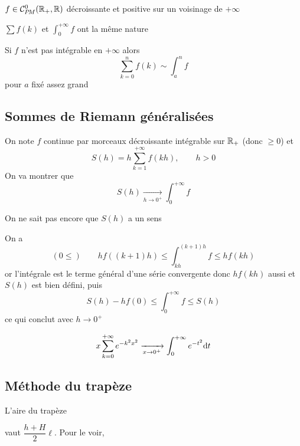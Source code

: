 \begin{prop}
    \Hyp $f\in \CPM(\R_+, \R)$ décroissante et positive sur un voisinage de $+\infty$
    \begin{concenum}
    \item $\sum f(k)$ et $\int_0^{+\infty} f$ ont la même nature
    \item Si $f$ n'est pas intégrable en $+\infty$ alors \[
            \sum_{k=0}^nf(k)\sim\int_a^nf
        \]
        pour $a$ fixé assez grand
    \end{concenum}
\end{prop}

\subsection{Sommes de Riemann généralisées}

On note $f$ continue par morceaux décroissante intégrable sur $\mathbb R_+$ (donc $\geq 0$) et \[
    S(h)=h\sum_{k=1}^{+\infty}f(kh), \qquad h>0
\]
On va montrer que \[
    S(h)\xrightarrow[h\to0^+]{} \int_0^{+\infty} f
\]

\begin{rem}
    On ne sait pas encore que $S(h)$ a un sens
\end{rem}

On a \[
    (0\leq) \qquad hf((k+1)h)\leq \int_{kh}^{(k+1)h}f\leq hf(kh)
\]
or l'intégrale est le terme général d'une série convergente donc $hf(kh)$ aussi et $S(h)$ est bien défini, puis \[
    S(h)-hf(0)\leq \int_0^{+\infty}f\leq S(h)
\]
ce qui conclut avec $h\to0^+$

\begin{ex}
    \[
        x\sum_{k=0}^{+\infty}e^{-k^2x^2}\xrightarrow[x\to 0^+]{}\int_0^{+\infty}e^{-t^2}\mathrm{d} t
    \]
\end{ex}

\subsection{Méthode du trapèze}

\begin{rem}
    L'aire du trapèze \hspace{1em}\hspace{1em} vaut $\dfrac{h+H}2\ell$. Pour le voir, 
\end{rem}

